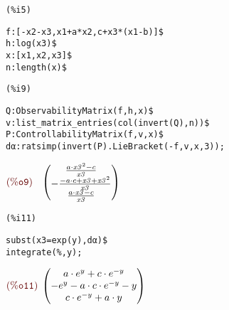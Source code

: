 \noindent
\begin{minipage}[t]{8ex}\color{red}\bf
\begin{verbatim}
(%i5) 
\end{verbatim}
\end{minipage}
\begin{minipage}[t]{\textwidth}\color{blue}
\begin{verbatim}
f:[-x2-x3,x1+a*x2,c+x3*(x1-b)]$
h:log(x3)$
x:[x1,x2,x3]$
n:length(x)$
\end{verbatim}
\end{minipage}

\smallskip

\noindent
\begin{minipage}[t]{8ex}\color{red}\bf
\begin{verbatim}
(%i9) 
\end{verbatim}
\end{minipage}
\begin{minipage}[t]{\textwidth}\color{blue}
\begin{verbatim}
Q:ObservabilityMatrix(f,h,x)$
v:list_matrix_entries(col(invert(Q),n))$
P:ControllabilityMatrix(f,v,x)$
dα:ratsimp(invert(P).LieBracket(-f,v,x,3));
\end{verbatim}
\end{minipage}

\noindent
$\displaystyle
\parbox{8ex}{$\color{labelcolor}\mathrm{\tt (\%o9) }\quad $}
\begin{pmatrix}\frac{a\cdot {{\mathit{x3}}^{2}}-c}{\mathit{x3}}\cr -\frac{-a\cdot c+\mathit{x3}+{{\mathit{x3}}^{2}}}{\mathit{x3}}\cr \frac{a\cdot \mathit{x3}-c}{\mathit{x3}}\end{pmatrix}\mbox{}
$


\noindent
\begin{minipage}[t]{8ex}\color{red}\bf
\begin{verbatim}
(%i11) 
\end{verbatim}
\end{minipage}
\begin{minipage}[t]{\textwidth}\color{blue}
\begin{verbatim}
subst(x3=exp(y),dα)$
integrate(%,y);
\end{verbatim}
\end{minipage}

\noindent
$\displaystyle
\parbox{8ex}{$\color{labelcolor}\mathrm{\tt (\%o11) }\quad $}
\begin{pmatrix}a\cdot {{e}^{y}}+c\cdot {{e}^{-y}}\cr -{{e}^{y}}-a\cdot c\cdot {{e}^{-y}}-y\cr c\cdot {{e}^{-y}}+a\cdot y\end{pmatrix}\mbox{}
$
